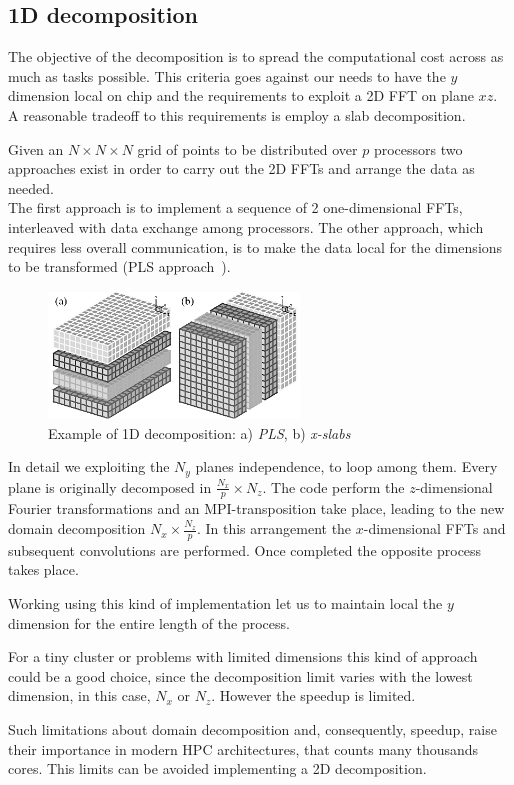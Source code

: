 \subsection{1D decomposition}
The objective of the decomposition is to spread the computational cost across as much as tasks possible. This criteria goes against our needs to have the $y$ dimension local on chip and the requirements to exploit a 2D FFT on plane $xz$.
A reasonable tradeoff to this requirements is employ a slab decomposition. 
\par
Given an $N\times N\times N$ grid of points to be distributed over $p$ processors two approaches exist in order to carry out the 2D FFTs and arrange the data as needed.\\
The first approach is to implement a sequence of 2 one-dimensional FFTs, interleaved with data exchange among processors. The other approach, which requires less overall communication, is to make the data local for the dimensions to be transformed (PLS approach~\cite{cpl:presentazione}). \\
\begin{figure}
\begin{center}
\includegraphics[width=0.6\textwidth]{grafici/1d_decomp}
\caption{Example of 1D decomposition: a) \emph{PLS},  b) \emph{x-slabs}}
\label{1d:decomp}
\end{center}
\end{figure}
\par
In detail we exploiting the $N_{y}$ planes independence, to loop among them. Every plane is originally decomposed in $\frac{N_{x}}{p}\times N_{z}$. The code perform the $z$-dimensional Fourier transformations and an MPI-transposition take place, leading to the new domain decomposition $N_{x} \times \frac{N_{z}}{p}$. In this arrangement the $x$-dimensional FFTs and subsequent convolutions are performed. Once completed the opposite process takes place. 
\par
Working using this kind of implementation let us to maintain local the $y$ dimension for the entire length of the process. 
\par
For a tiny cluster or problems with limited dimensions this kind of approach could be a good choice, since the decomposition limit varies with the lowest dimension, in this case, $N_{x}$ or $N_{z}$. However the speedup is limited. 
\par
Such limitations about domain decomposition and, consequently, speedup, raise their importance in modern HPC architectures, that counts many thousands cores.  
This limits can be avoided implementing a 2D decomposition.





